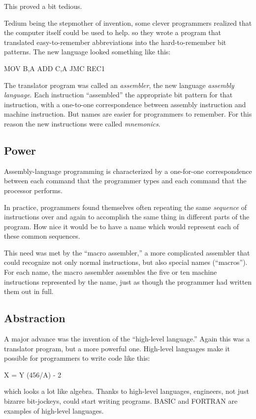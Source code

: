 This proved a bit tedious.

Tedium being the stepmother of invention, some clever programmers
realized that the computer itself could be used to help.  so they
wrote a program that translated easy-to-remember
abbreviations into the hard-to-remember bit
patterns. The new language looked something like this:
\begin{Code}
MOV B,A
ADD C,A
JMC REC1
\end{Code}
The translator program was called an
\emph{assembler},
the new language
\emph{assembly language}.
Each instruction ``assembled'' the appropriate bit pattern for that
instruction, with a one-to-one correspondence between assembly
instruction and machine instruction.  But names are easier for
programmers to remember. For this reason the new instructions were called
\emph{mnemonics}.


\subsection{Power}
Assembly-language
programming is characterized by a one-for-one correspondence
between each command that the programmer types and each command that
the processor performs.

In practice, programmers found themselves often repeating the same
\emph{sequence} of instructions over and again to accomplish the same
thing in different parts of the program.  How nice it would be to have
a name which would represent each of these common sequences.

This need was met by the ``macro assembler,''
a more complicated assembler that could recognize not only normal
instructions, but also special names (``macros''). For each name, the
macro assembler assembles the five or ten machine instructions
represented by the name, just as though the programmer had written
them out in full.


\subsection{Abstraction}
A major advance was the invention of the ``high-level language.''
Again this was a translator program, but a more powerful
 one. High-level
languages make it possible for programmers to write code like this:
\begin{Code}
X = Y (456/A) - 2
\end{Code}
which looks a lot like algebra. Thanks to high-level languages,
engineers, not just bizarre bit-jockeys, could start writing programs.
BASIC and FORTRAN are examples of
high-level languages.

